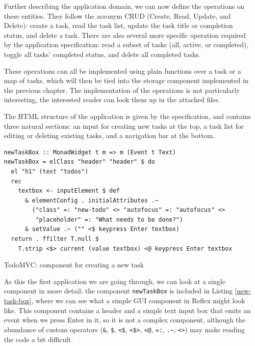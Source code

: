 \documentclass[english,zadani,odsaz]{fitthesis}
\begin{document}
Further describing the application domain, we can now define the operations on
these entities. They follow the acronym CRUD (Create, Read, Update, and Delete):
create a task, read the task list, update the task title or completion status,
and delete a task. There are also several more specific operation required by
the application specification: read a subset of tasks (all, active, or
completed), toggle all tasks' completed status, and delete all completed tasks.

These operations can all be implemented using plain functions over a task or a
map of tasks, which will then be tied into the storage component implemented in
the previous chapter. The implementation of the operations is not particularly
interesting, the interested reader can look them up in the attached files.

The HTML structure of the application is given by the specification, and
contains three natural sections: an input for creating new tasks at the top, a
task list for editing or deleting existing tasks, and a navigation bar at the
bottom.

\begin{listing}[b]
\begin{verbatim}
newTaskBox :: MonadWidget t m => m (Event t Text)
newTaskBox = elClass "header" "header" $ do
  el "h1" (text "todos")
  rec
    textbox <- inputElement $ def
      & elementConfig . initialAttributes .~
        ("class" =: "new-todo" <> "autofocus" =: "autofocus" <>
         "placeholder" =: "What needs to be done?")
      & setValue .~ ("" <$ keypress Enter textbox)
  return . ffilter T.null $
    T.strip <$> current (value textbox) <@ keypress Enter textbox
\end{verbatim}
\caption{TodoMVC: component for creating a new task \label{new-task-box}}
\end{listing}

As this the first application we are going through, we can look at a single
component in more detail: the component \texttt{newTaskBox} is included in Listing
\ref{new-task-box}, where we can see what a simple GUI component in Reflex might
look like. This component contains a header and a simple text input box that
emits an event when we press Enter in it, so it is not a complex component,
although the abundance of custom operators (\texttt{\&}, \texttt{\$}, \texttt{<\$}, \texttt{<\$>}, \texttt{<@}, \texttt{=:}, \texttt{.\textasciitilde{}}, \texttt{<>}) may
make reading the code a bit difficult.
\end{document}
